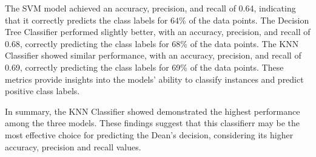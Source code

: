 The SVM model achieved an accuracy, precision, and recall of 0.64, indicating that it correctly predicts the class labels for 64\% of the data points. The Decision Tree Classifier performed slightly better, with an accuracy, precision, and recall of 0.68, correctly predicting the class labels for 68\% of the data points. The KNN Classifier showed similar performance, with an accuracy, precision, and recall of 0.69, correctly predicting the class labels for 69\% of the data points. These metrics provide insights into the models' ability to classify instances and predict positive class labels.

In summary, the KNN Classifier showed demonstrated the highest performance among the three models. These findings suggest that this classifierr may be the most effective choice for predicting the Dean's decision, considering its higher accuracy, precision and recall values.
